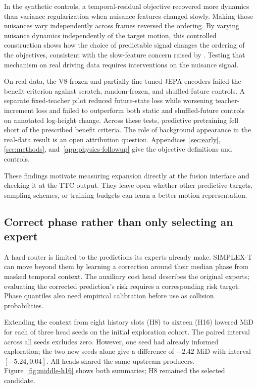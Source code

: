 In the synthetic controls, a temporal-residual objective recovered more dynamics than variance regularization when nuisance features changed slowly. Making those nuisances vary independently across frames reversed the ordering. By varying nuisance dynamics independently of the target motion, this controlled construction shows how the choice of predictable signal changes the ordering of the objectives, consistent with the slow-feature concern raised by \citet{slowfeatures}. Testing that mechanism on real driving data requires interventions on the nuisance signal. 

On real data, the V8 frozen and partially fine-tuned JEPA encoders failed the benefit criterion against scratch, random-frozen, and shuffled-future controls. A separate fixed-teacher pilot reduced future-state loss while worsening teacher-increment loss and failed to outperform both static and shuffled-future controls on annotated log-height change. Across these tests, predictive pretraining fell short of the prescribed benefit criteria. The role of background appearance in the real-data result is an open attribution question. Appendices~\ref{sec:early}, \ref{sec:methods}, and~\ref{app:physics-followup} give the objective definitions and controls. 

These findings motivate measuring expansion directly at the fusion interface and checking it at the TTC output. They leave open whether other predictive targets, sampling schemes, or training budgets can learn a better motion representation.

\subsection{Correct phase rather than only selecting an expert}
A hard router is limited to the predictions its experts already make. SIMPLEX-T can move beyond them by learning a correction around their median phase from masked temporal context. The auxiliary cost head describes the original experts; evaluating the corrected prediction's risk requires a corresponding risk target. Phase quantiles also need empirical calibration before use as collision probabilities. 

Extending the context from eight history slots (H8) to sixteen (H16) lowered MiD for each of three head seeds on the initial exploration cohort. The paired interval across all seeds excludes zero. However, one seed had already informed exploration; the two new seeds alone give a difference of $-2.42$ MiD with interval $[-5.24,0.04]$. All heads shared the same upstream producers. Figure~\ref{fig:middle-h16} shows both summaries; H8 remained the selected candidate. 


